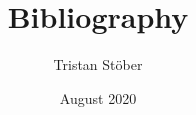 \documentclass{article}
\title{Bibliography}
\author{Tristan Stöber}
\date{August 2020}
\begin{document}
\maketitle

\nocite{*}



\end{document}
